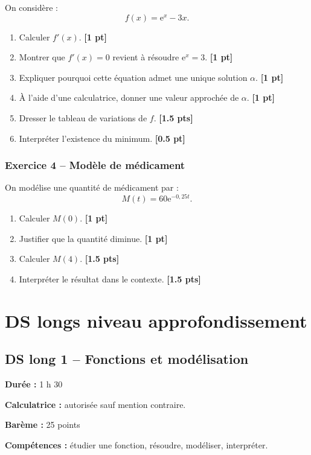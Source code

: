 \documentclass[11pt,a4paper]{article}
\newcommand{\e}{\mathrm{e}}
\newcommand{\pts}[1]{\hfill \textbf{[#1 pt]}}
\newcommand{\ptss}[1]{\hfill \textbf{[#1 pts]}}
\newcommand{\competences}[1]{\textbf{Compétences :} #1}
\newcommand{\calculatrice}{\textbf{Calculatrice :} autorisée sauf mention contraire.}
\newcommand{\duree}[1]{\textbf{Durée :} #1}
\newcommand{\bareme}[1]{\textbf{Barème :} #1}
\begin{document}
On considère :
\[
f(x)=\e^x-3x.
\]
\begin{enumerate}
    \item Calculer $f'(x)$. \pts{1}
    \item Montrer que $f'(x)=0$ revient à résoudre $\e^x=3$. \pts{1}
    \item Expliquer pourquoi cette équation admet une unique solution $\alpha$. \pts{1}
    \item À l'aide d'une calculatrice, donner une valeur approchée de $\alpha$. \pts{1}
    \item Dresser le tableau de variations de $f$. \ptss{1.5}
    \item Interpréter l'existence du minimum. \pts{0.5}
\end{enumerate}

\subsubsection*{Exercice 4 -- Modèle de médicament}

On modélise une quantité de médicament par :
\[
M(t)=60\e^{-0,25t}.
\]
\begin{enumerate}
    \item Calculer $M(0)$. \pts{1}
    \item Justifier que la quantité diminue. \pts{1}
    \item Calculer $M(4)$. \ptss{1.5}
    \item Interpréter le résultat dans le contexte. \ptss{1.5}
\end{enumerate}

\newpage

\section{DS longs niveau approfondissement}

\subsection*{DS long 1 -- Fonctions et modélisation}

\begin{sujetbox}
\duree{1 h 30}

\calculatrice

\bareme{25 points}

\competences{étudier une fonction, résoudre, modéliser, interpréter.}
\end{sujetbox}
\end{document}
